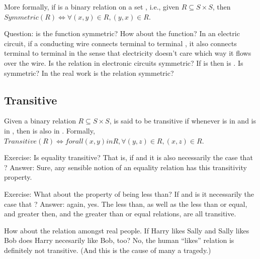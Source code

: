 \documentclass[letterpaper,10pt,english]{sphinxmanual}
\begin{document}
More formally, if  is a binary relation on a set , i.e., given
\(R \subseteq S \times S\), then \(Symmetric(R) \iff \forall
(x,y) \in R, (y,x) \in R\).

Question: is the function  symmetric? How about the 
function? In an electric circuit, if a conducting wire connects
terminal  to terminal , it also connects terminal  to
terminal  in the sense that electricity doesn’t care which way it
flows over the wire. Is the  relation in electronic circuits
symmetric? If  is   then  is  . Is 
symmetric? In the real work is the  relation symmetric?


\subsection{Transitive}
\label{\detokenize{07-set-theory:transitive}}
Given a binary relation \(R \subseteq S \times S\),  is said to
be transitive if whenever  is in  and  is in ,
then  is also in . Formally, \(Transitive(R) \iff
forall (x,y) in R, \forall (y,z) \in R, (x,z) \in R\).

Exercise: Is equality transitive? That is, if  and  it
is also necessarily the case that ? Answer: Sure, any sensible
notion of an equality relation has this transitivity property.

Exercise: What about the property of being less than? If  and
 is it necessarily the case that ? Answer: again,
yes. The less than, as well as the less than or equal, and greater
then, and the greater than or equal relations, are all transitive.

How about the  relation amongst real people. If Harry likes
Sally and Sally likes Bob does Harry necesarily like Bob, too? No, the
human “likes” relation is definitely not transitive. (And this is the
cause of many a tragedy.)
\end{document}
